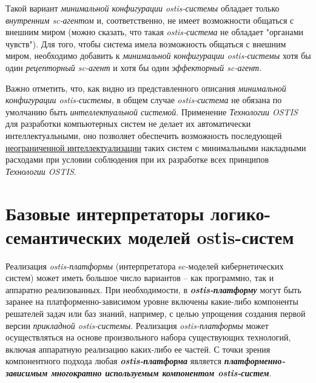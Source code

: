 Такой вариант \textit{минимальной конфигурации ostis-системы} обладает только \textit{внутренним sc-агентом} и, соответственно, не имеет возможности общаться с внешним миром (можно сказать, что такая \textit{ostis-система} не обладает "органами чувств"). Для того, чтобы система имела возможность общаться с внешним миром, необходимо добавить к \textit{минимальной конфигурации ostis-системы} хотя бы один \textit{рецепторный sc-агент} и хотя бы один \textit{эффекторный sc-агент}.

Важно отметить, что, как видно из представленного описания \textit{минимальной конфигурации ostis-системы}, в общем случае \textit{ostis-система} не обязана по умолчанию быть \textit{интеллектуальной системой}. Применение \textit{Технологии OSTIS} для разработки компьютерных систем не делает их автоматически интеллектуальными, оно позволяет обеспечить возможность последующей \uline{неограниченной интеллектуализации} таких систем с минимальными накладными расходами при условии соблюдения при их разработке всех принципов \textit{Технологии OSTIS}.

\section{Базовые интерпретаторы логико-семантических моделей ostis-систем}

\begin{SCn}
\end{SCn}

Реализация \textit{ostis-платформы} (интерпретатора sc-моделей кибернетических систем) может иметь большое число вариантов -- как программно, так и аппаратно реализованных. При необходимости, в \textbf{\textit{ostis-платформу}} могут быть заранее на платформенно-зависимом уровне включены какие-либо компоненты решателей задач или баз знаний, например, с целью упрощения создания первой версии \textit{прикладной ostis-системы}. Реализация \textit{ostis-платформы} может осуществляться на основе произвольного набора существующих технологий, включая аппаратную реализацию каких-либо ее частей. С точки зрения компонентного подхода любая \textbf{\textit{ostis-платформа}} является \textbf{\textit{платформенно-зависимым многократно используемым компонентом ostis-систем}}.

